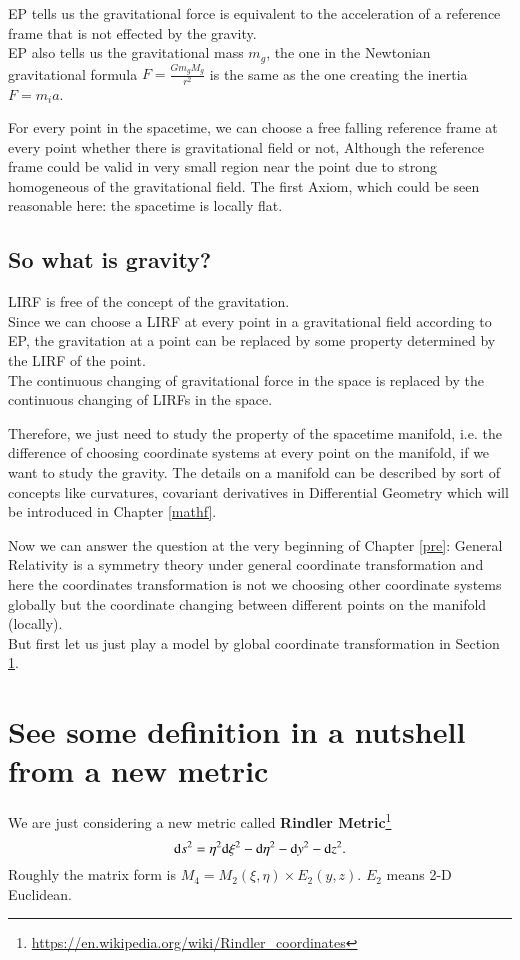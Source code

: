 \documentclass[openany,10pt]{book}
\theoremstyle{definition}
\theoremstyle{definition}
\theoremstyle{remark}
\begin{document}
EP tells us the gravitational force is equivalent to the acceleration of a reference frame that is not effected by the gravity.\\
EP also tells us the gravitational mass $m_g$, the one in the Newtonian gravitational formula $F=\frac{Gm_gM_g}{r^2}$ is the same as the one creating the inertia $F=m_i a$.

For every point in the spacetime, we can choose a free falling reference frame at every point whether there is gravitational field or not, Although the reference frame could be valid in very small region near the point due to strong homogeneous of the gravitational field. The first Axiom, which could be seen reasonable here: the spacetime is locally flat.

\subsection{So what is gravity?}

LIRF is free of the concept of the gravitation.\\
Since we can choose a LIRF at every point in a gravitational field according to EP, the  gravitation at a point can be replaced by some property determined by the LIRF of the point. \\
The continuous changing of gravitational force in the space is replaced by the continuous changing of LIRFs in the space.

Therefore, we just need to study the property of the spacetime manifold, i.e. the difference of choosing coordinate systems at every point on the manifold,  if we want to study the gravity. The details on a manifold can be described by sort of concepts like curvatures, covariant derivatives in Differential Geometry which will be introduced in Chapter \ref{mathf}.

Now we can answer the question at the very beginning of Chapter \ref{pre}: General Relativity is a symmetry theory under general coordinate transformation and here the coordinates transformation is not we choosing other coordinate systems globally but the coordinate changing between different points on the manifold (locally).\\
But first let us just play a model by global coordinate transformation in Section \ref{rindler}.

\section{See some definition in a nutshell from a new metric}\label{rindler}
We are just considering a new metric called {\bfseries Rindler Metric}\footnote{\url{https://en.wikipedia.org/wiki/Rindler_coordinates}}
\begin{equation}
    {\rm d}s^2=\eta^2{\rm d}\xi^2-{\rm d}\eta^2-{\rm d}y^2-{\rm d}z^2.
\end{equation}
Roughly the matrix form is $M_4=M_2(\xi,\eta) \times E_2(y,z)$. $E_2$ means 2-D Euclidean.
\end{document}
